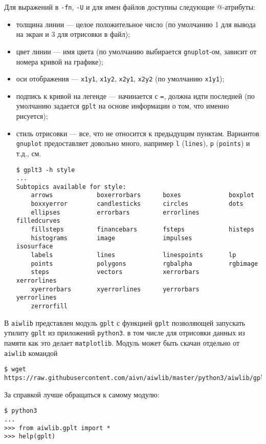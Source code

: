 \documentclass[12pt]{article}
\def\gplt{{\tt gplt}}
\def\gnuplot{{\tt gnuplot}}
\def\python{{\tt python3}}
\begin{document}
Для выражений в \verb'-fn', \verb'-U' и для имен файлов доступны следующие @-атрибуты:
\begin{itemize}
\item толщина линии --- целое положительное число (по умолчанию 1 для вывода на экран и 3 для отрисовки в файл);
\item цвет линии --- имя цвета (по умолчанию выбирается \gnuplot-ом, зависит от номера кривой на графике);
\item оси отображения --- \verb'x1y1', \verb'x1y2', \verb'x2y1', \verb'x2y2' (по умолчанию \verb'x1y1');
\item подпись к кривой на легенде --- начинается с \verb'=', должна идти последней (по умолчанию задается \gplt{} на основе информации о том, что именно рисуется);
\item стиль отрисовки --- все, что не относится к предыдущим пунктам. Вариантов \gnuplot{} предоставляет довольно много, например \verb'l' (\verb'lines'),
  \verb'p' (\verb'points') и т.д., см.
\begin{verbatim}
$ gplt3 -h style
...
Subtopics available for style:
    arrows            boxerrorbars      boxes             boxplot
    boxxyerror        candlesticks      circles           dots
    ellipses          errorbars         errorlines        filledcurves
    fillsteps         financebars       fsteps            histeps
    histograms        image             impulses          isosurface
    labels            lines             linespoints       lp
    points            polygons          rgbalpha          rgbimage
    steps             vectors           xerrorbars        xerrorlines
    xyerrorbars       xyerrorlines      yerrorbars        yerrorlines
    zerrorfill
\end{verbatim}
\end{itemize}

В \verb'aiwlib' представлен модуль \verb'gplt' с функцией \verb'gplt' позволяющей запускать утилиту \gplt{} из приложений \python.
в том числе для отрисовки данных из памяти как это делает \verb'matplotlib'.
Модуль может быть скачан отдельно от \verb'aiwlib' командой
\begin{verbatim}
$ wget https://raw.githubusercontent.com/aivn/aiwlib/master/python3/aiwlib/gplt.py
\end{verbatim}
За справкой лучше обращаться к самому модулю:
\begin{verbatim}
$ python3
...
>>> from aiwlib.gplt import *
>>> help(gplt)
\end{verbatim}
\end{document}
